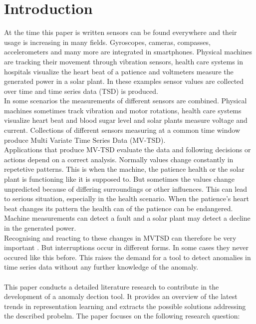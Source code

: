 \section{Introduction}\label{intro}
At the time this paper is written sensors can be found everywhere and their usage is increasing in many fields. Gyroscopes, cameras, compasses, accelerometers and many more are integrated in smartphones. Physical machines are tracking their movement through vibration sensors, health care systems in hospitals visualize the heart beat of a patience and voltmeters measure the generated power in a solar plant. In these examples sensor values are collected over time and time series data (TSD) is produced.\\
In some scenarios the measurements of different sensors are combined. Physical machines sometimes track vibration and motor rotations, health care systems visualize heart beat and blood sugar level and solar plants measure voltage and current.
Collections of different sensors measuring at a common time window produce Multi Variate Time Series Data (MV-TSD).\\
Applications that produce MV-TSD evaluate the data and following decisions or actions depend on a correct analysis.
Normally values change constantly in repetetive patterns. This is when the machine, the patience health or the solar plant is functioning like it is supposed to. But sometimes the values change unpredicted because of differing surroundings or other influences. This can lead to serious situation, especially in the health scenario. When the patience's heart beat changes its pattern the health can of the patience can be endangered. Machine measurements can detect a fault and a solar plant may detect a decline in the generated power.\\
Recognising and reacting to these changes in MVTSD can therefore be very important%
. But interruptions occur in different forms. In some cases they never occured like this before. This raises the demand for a tool to detect anomalies in time series data without any further knowledge of the anomaly.\\\\
This paper conducts a detailed literature research to contribute in the development of a anomaly dection tool. It provides an overview of the latest trends in representation learning and extracts the possible solutions addressing the described probelm. The paper focuses on the following research question:\\\\
